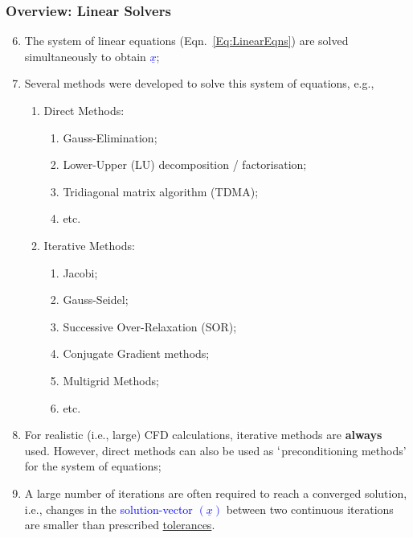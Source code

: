 \documentclass[10pt,compress]{beamer}
\begin{document}
\begin{frame}
 \frametitle{Overview: Linear Solvers} 
\begin{enumerate}
  \setcounter{enumi}{5}
  \item <1-> The system of linear equations (Eqn.~\ref{Eq:LinearEqns}) are solved simultaneously to obtain \textcolor{blue}{$\underline{x}$};
  \item <2-> Several methods were developed to solve this system of equations, e.g.,
    \begin{enumerate}
       \item<3-> Direct Methods: 
          \begin{enumerate}
             \item <5-> Gauss-Elimination;
             \item <6-> Lower-Upper (LU) decomposition / factorisation;
             \item <7-> Tridiagonal matrix algorithm (TDMA);
             \item <8-> etc. 
          \end{enumerate}
       \item<4-> Iterative Methods:
          \begin{enumerate}
             \item <9-> Jacobi;
             \item <10-> Gauss-Seidel;
             \item <11-> Successive Over-Relaxation (SOR);
             \item <12-> Conjugate Gradient methods;
             \item <13-> Multigrid Methods;
             \item <14-> etc.
          \end{enumerate}
    \end{enumerate}
  \item <15-> For realistic (i.e., large) CFD calculations, iterative methods are {\bf always} used. However, direct methods can also be used as $\lq$preconditioning methods' for the system of equations;
   \item <16-> A large number of iterations are often required to reach a converged solution, i.e., changes in the \textcolor{blue}{solution-vector $\left(\underline{x}\right)$} between two continuous iterations are smaller than prescribed \underline{tolerances}.
\end{enumerate}

\end{frame}
 
\end{document}
